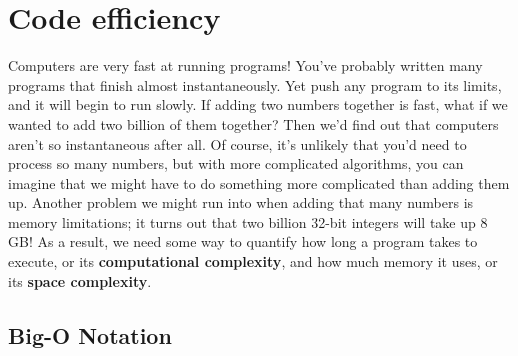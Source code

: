 \section{Code efficiency}

Computers are very fast at running programs! You've probably written many programs that finish almost instantaneously. Yet push any program to its limits, and it will begin to run slowly. If adding two numbers together is fast, what if we wanted to add two billion of them together? Then we'd find out that computers aren't so instantaneous after all. Of course, it's unlikely that you'd need to process so many numbers, but with more complicated algorithms, you can imagine that we might have to do something more complicated than adding them up. Another problem we might run into when adding that many numbers is memory limitations; it turns out that two billion 32-bit integers will take up 8 GB! As a result, we need some way to quantify how long a program takes to execute, or its \textbf{computational complexity}, and how much memory it uses, or its \textbf{space complexity}.


\subsection{Big-O Notation}


